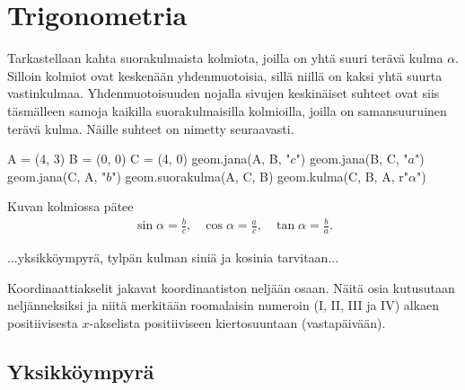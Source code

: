 
\section*{Trigonometria}

Tarkastellaan kahta suorakulmaista kolmiota, joilla on yhtä suuri terävä kulma $\alpha$.
Silloin kolmiot ovat keskenään yhdenmuotoisia, sillä niillä on kaksi yhtä suurta vastinkulmaa.
Yhdenmuotoisuuden nojalla sivujen keskinäiset suhteet ovat siis täsmälleen samoja kaikilla
suorakulmaisilla kolmioilla, joilla on samansuuruinen terävä kulma. Näille suhteet on
nimetty seuraavasti.


\begin{esimerkki}
\begin{center}
\begin{kuva}
	A = (4, 3)
	B = (0, 0)
	C = (4, 0)
	geom.jana(A, B, "$c$")
	geom.jana(B, C, "$a$")
	geom.jana(C, A, "$b$")
	geom.suorakulma(A, C, B)
	geom.kulma(C, B, A, r"$\alpha$")
\end{kuva}
\end{center}
Kuvan kolmiossa pätee
\[
\begin{array}{ccc}
\displaystyle\sin \alpha = \frac{b}{c}, &
\displaystyle\cos \alpha = \frac{a}{c}, &
\displaystyle\tan \alpha = \frac{b}{a}.
\end{array}
\]
\end{esimerkki}

...yksikköympyrä, tylpän kulman siniä ja kosinia tarvitaan...


Koordinaattiakselit jakavat koordinaatiston neljään osaan. Näitä osia kutusutaan neljänneksiksi ja niitä merkitään roomalaisin numeroin (I, II, III ja IV) alkaen positiivisesta $x$-akselista positiiviseen kiertosuuntaan (vastapäivään).

\subsection{Yksikköympyrä}

